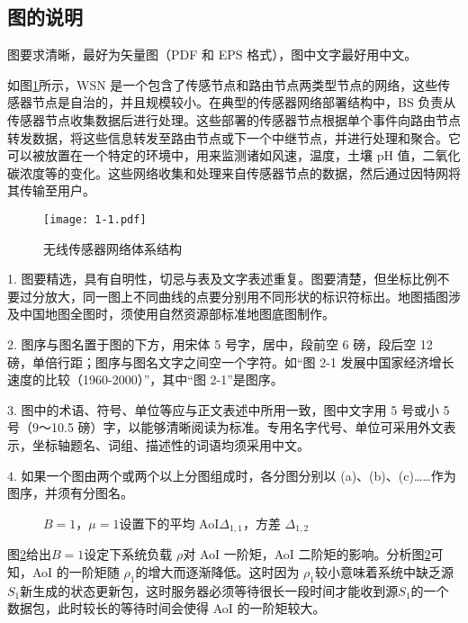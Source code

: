 \subsection{图的说明}

图要求清晰，最好为矢量图（PDF 和 EPS 格式），图中文字最好用中文。

如图\ref{Fig1-1}所示，WSN 是一个包含了传感节点和路由节点两类型节点的网络，这些传感器节点是自治的，并且规模较小。在典型的传感器网络部署结构中，BS 负责从传感器节点收集数据后进行处理。这些部署的传感器节点根据单个事件向路由节点转发数据，将这些信息转发至路由节点或下一个中继节点，并进行处理和聚合。它可以被放置在一个特定的环境中，用来监测诸如风速，温度，土壤 pH 值，二氧化碳浓度等的变化。这些网络收集和处理来自传感器节点的数据，然后通过因特网将其传输至用户。

\begin{figure}[htbp]
\vspace*{6pt}
\centering
\texttt{[image: 1-1.pdf]}
\caption{无线传感器网络体系结构}\label{Fig1-1}
\vspace*{10pt}
\end{figure}


\textcolor[rgb]{1.00,0.00,0.00}{1. 图要精选，具有自明性，切忌与表及文字表述重复。图要清楚，但坐标比例不要过分放大，同一图上不同曲线的点要分别用不同形状的标识符标出。地图插图涉及中国地图全图时，须使用自然资源部标准地图底图制作。}

\textcolor[rgb]{1.00,0.00,0.00}{2. 图序与图名置于图的下方，用宋体 5 号字，居中，段前空 6 磅，段后空 12 磅，单倍行距；图序与图名文字之间空一个字符。如“图 2-1 发展中国家经济增长速度的比较（1960-2000）”，其中“图 2-1”是图序。}

\textcolor[rgb]{1.00,0.00,0.00}{3. 图中的术语、符号、单位等应与正文表述中所用一致，图中文字用 5 号或小 5 号（9～10.5 磅）字，以能够清晰阅读为标准。专用名字代号、单位可采用外文表示，坐标轴题名、词组、描述性的词语均须采用中文。}

\textcolor[rgb]{1.00,0.00,0.00}{4. 如果一个图由两个或两个以上分图组成时，各分图分别以 (a)、(b)、(c)……作为图序，并须有分图名。}


\begin{figure}[htbp]
	\vspace*{6pt}
	\centering
	\vspace{1pt}
	\caption{$B = 1$，$\mu  = 1$设置下的平均 AoI${\Delta _{1,1}}$，方差 ${\Delta _{1,2}}$}\label{Fig1-2}
	\vspace*{10pt}
\end{figure}
图\ref{Fig1-2}给出$B = 1$设定下系统负载 $\rho$对 AoI 一阶矩，AoI 二阶矩的影响。分析图\ref{Fig1-2}可知，AoI 的一阶矩随 ${\rho_1}$的增大而逐渐降低。这时因为 ${\rho _1}$较小意味着系统中缺乏源${S_1}$新生成的状态更新包，这时服务器必须等待很长一段时间才能收到源${S_1}$的一个数据包，此时较长的等待时间会使得 AoI 的一阶矩较大。



